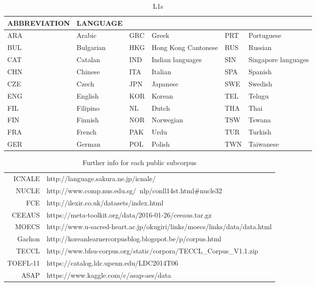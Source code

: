 \documentclass{article} %
\begin{document}
\begin{table}[H]
\caption{L1s}
\label{L1s-table}
\begin{center}
\begin{tabularx}{\textwidth}{l l l l l l }
\multicolumn{1}{c}{\bf ABBREVIATION} & \multicolumn{1}{c}{\bf LANGUAGE} \\
\hline
ARA & Arabic &    GRC  & Greek   &          PRT  & Portuguese \\
BUL & Bulgarian &      HKG  &  Hong Kong Cantonese       &    RUS  & Russian \\
CAT & Catalan &    IND  & Indian languages   &           SIN  & Singapore languages \\
CHN & Chinese &    ITA  & Italian        &   SPA  & Spanish \\
CZE & Czech &     JPN  & Japanese         &     SWE  & Swedish \\
ENG & English &    KOR  & Korean         &   TEL  & Telugu \\
FIL & Filipino &       NL  &  Dutch      &       THA &  Thai \\
FIN & Finnish &    NOR &  Norwegian       &      TSW  & Tswana \\
FRA & French &     PAK  & Urdu         &     TUR  & Turkish \\
GER & German &     POL  & Polish    &        TWN  & Taiwanese
\end{tabularx}
\end{center}
\end{table}


\begin{table}[H]
\caption{Further info for each public subcorpus}
\label{further-info}
\begin{center}
\begin{tabular}{r l}
ICNALE & http://language.sakura.ne.jp/icnale/ \\
NUCLE & http://www.comp.nus.edu.sg/~nlp/conll14st.html\#nucle32 \\
FCE & http://ilexir.co.uk/datasets/index.html \\
CEEAUS & https://meta-toolkit.org/data/2016-01-26/ceeaus.tar.gz \\
MOECS & http://www.u-sacred-heart.ac.jp/okugiri/links/moecs/links/data/data.html \\
Gachon & http://koreanlearnercorpusblog.blogspot.be/p/corpus.html \\
TECCL & http://www.bfsu-corpus.org/static/corpora/TECCL\_Corpus\_V1.1.zip \\
TOEFL-11 & https://catalog.ldc.upenn.edu/LDC2014T06 \\
ASAP & https://www.kaggle.com/c/asap-aes/data
\end{tabular}
\end{center}
\end{table}
\end{document}
